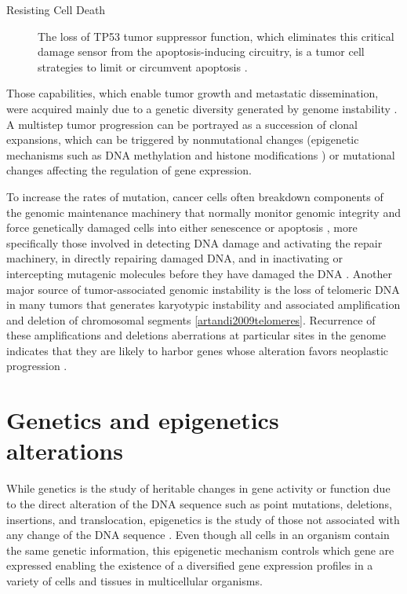 \begin{description}
    \item[Resisting Cell Death]
    The loss of TP53 tumor suppressor function, which eliminates this critical damage sensor from the apoptosis-inducing circuitry, is a tumor cell strategies to limit or circumvent apoptosis \cite{hanahan2011hallmarks}.
\end{description}

Those capabilities, which enable tumor growth and metastatic dissemination, were acquired mainly due to a genetic diversity
 generated  by genome instability \cite{hanahan2011hallmarks}.
 A multistep tumor progression can be portrayed as
a succession of clonal expansions, which can be triggered
by nonmutational changes (epigenetic mechanisms such as DNA methylation and histone modifications \cite{berdasco2010aberrant})
or mutational changes affecting the regulation of gene expression.

To increase  the rates of mutation, cancer cells often breakdown components of the genomic maintenance machinery
that normally monitor genomic integrity and force genetically damaged cells into either senescence or apoptosis \cite{jackson2009dna}, more specifically those involved in detecting DNA damage and activating the repair machinery, in directly repairing damaged DNA, and in inactivating or intercepting mutagenic molecules before they have damaged the DNA \cite{negrini2010genomic}. Another major source of tumor-associated genomic instability is the loss of telomeric DNA  in many tumors that generates karyotypic instability and associated amplification and deletion of chromosomal segments \ref{artandi2009telomeres}.  Recurrence  of these amplifications and deletions aberrations at particular sites in the genome
indicates that they are likely to harbor genes whose alteration favors neoplastic progression \cite{korkola2010breast}.


\section{Genetics and epigenetics alterations} \label{sec:concept-alteration}

While genetics is the study of heritable changes in gene activity or function due
to the direct alteration of the DNA sequence such as point mutations, deletions,
insertions, and translocation, epigenetics is the study of  those not associated with any change of the DNA sequence \cite{moore2013dna}.
Even though all cells in an organism contain the same genetic information,
this epigenetic mechanism controls which gene are expressed enabling the existence of
a diversified gene expression profiles
in a variety of cells and tissues in multicellular organisms.


